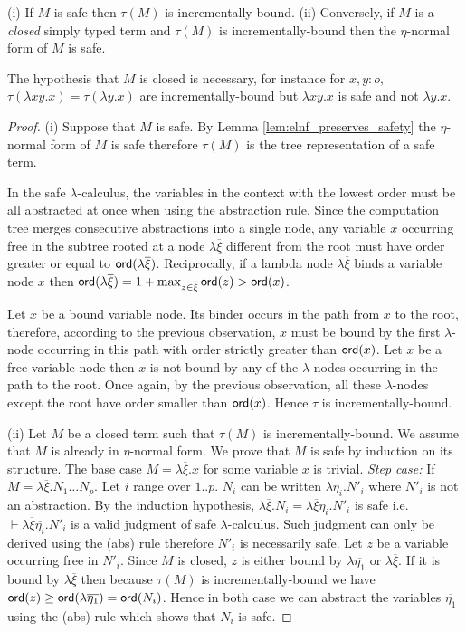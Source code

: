 \documentclass{llncs}
\newcommand\ord[1]{{\sf ord}(#1)}
\begin{document}
\begin{proposition} %
\label{prop:safe_imp_incrbound}
(i) If $M$ is safe then $\tau(M)$ is incrementally-bound.
(ii) Conversely, if $M$ is a \emph{closed} simply typed term and $\tau(M)$ is incrementally-bound then the $\eta$-normal form of $M$ is safe.
\end{proposition}

The hypothesis that $M$ is closed is necessary, for instance for $x,y:o$, $\tau(\lambda x y .x) = \tau(\lambda y . x)$
are incrementally-bound but $\lambda x y .x$ is safe and not $\lambda y . x$.

\begin{proof}
(i) Suppose that $M$ is safe. By Lemma \ref{lem:elnf_preserves_safety}
the $\eta$-normal form of $M$ is safe therefore $\tau(M)$ is the tree representation of a safe term.

In the safe $\lambda$-calculus, the variables in the context with the lowest order must be all abstracted
at once when using the abstraction rule. Since the computation
tree merges consecutive abstractions into a single node,
any variable $x$ occurring free in the subtree rooted at a node $\lambda \overline{\xi}$ different from the root
must have order greater or equal to $\ord{\lambda \overline{\xi}}$. Reciprocally, if a lambda node
$\lambda \overline{\xi}$ binds a variable node $x$ then
$\ord{\lambda \overline{\xi}} = 1+\max_{z\in\overline{\xi}} \ord{z} > \ord{x}$.

Let $x$ be a bound variable node. Its binder occurs in the path from $x$
to the root, therefore, according to the previous observation, $x$ must be bound
by the first $\lambda$-node occurring in this path with order strictly
greater than $\ord{x}$. Let $x$ be a free variable node then $x$ is not bound
by any of the $\lambda$-nodes occurring in the path to the root. Once again, by the previous observation, all
these $\lambda$-nodes except the root have order smaller than $\ord{x}$. Hence
$\tau$ is incrementally-bound.

(ii) Let $M$ be a closed term such that $\tau(M)$ is incrementally-bound.
We assume that $M$ is already in $\eta$-normal form.
We prove that $M$ is safe by induction on its structure. The base case $M =
\lambda \overline{\xi} . x$ for some variable $x$ is trivial.
\emph{Step case:} If $M = \lambda \overline{\xi} . N_1 \ldots N_p$.
Let $i$ range over $1..p$. $N_i$ can be written $\lambda
\overline{\eta_i} . N'_i$ where $N'_i$ is not an abstraction. By the
induction hypothesis, $\lambda \overline{\xi} . N_i = \lambda
\overline{\xi} \overline{\eta_i} . N'_i$ is safe i.e.
$\vdash \lambda \overline{\xi} \overline{\eta_i} . N'_i$
is a valid judgment of safe $\lambda$-calculus.
Such judgment can only be derived using the (abs) rule therefore
$N'_i$ is necessarily safe. Let $z$ be a variable occurring free in
$N'_i$. Since $M$ is closed, $z$ is either bound by $\lambda
\overline{\eta_1}$ or $\lambda \overline{\xi}$. If it is bound by
$\lambda \overline{\xi}$ then because $\tau(M)$ is
incrementally-bound we have $\ord{z} \geq \ord{\lambda
\overline{\eta_1}} = \ord{N_i}$. Hence in both case we can abstract the variables
$\overline{\eta_1}$ using the (abs) rule which shows that $N_i$ is safe.


\end{proof}
\end{document}
